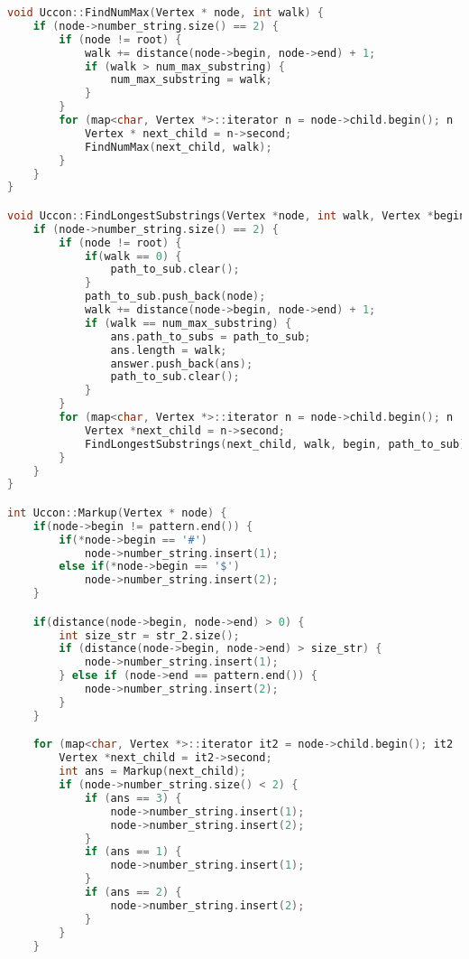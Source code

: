 \begin{lstlisting}[language=C++]
void Uccon::FindNumMax(Vertex * node, int walk) {
    if (node->number_string.size() == 2) {
        if (node != root) {
            walk += distance(node->begin, node->end) + 1;
            if (walk > num_max_substring) {
                num_max_substring = walk;
            }
        }
        for (map<char, Vertex *>::iterator n = node->child.begin(); n != node->child.end(); n++) {
            Vertex * next_child = n->second;
            FindNumMax(next_child, walk);
        }
    }
}

void Uccon::FindLongestSubstrings(Vertex *node, int walk, Vertex *begin, vector <Vertex *> path_to_sub) {
    if (node->number_string.size() == 2) {
        if (node != root) {
            if(walk == 0) {
                path_to_sub.clear();
            }
            path_to_sub.push_back(node);
            walk += distance(node->begin, node->end) + 1;
            if (walk == num_max_substring) {
                ans.path_to_subs = path_to_sub;
                ans.length = walk;
                answer.push_back(ans);
                path_to_sub.clear();
            }
        }
        for (map<char, Vertex *>::iterator n = node->child.begin(); n != node->child.end(); n++) {
            Vertex *next_child = n->second;
            FindLongestSubstrings(next_child, walk, begin, path_to_sub);
        }
    }
}

int Uccon::Markup(Vertex * node) {
    if(node->begin != pattern.end()) {
        if(*node->begin == '#')
            node->number_string.insert(1);
        else if(*node->begin == '$')
            node->number_string.insert(2);
    }

    if(distance(node->begin, node->end) > 0) {
        int size_str = str_2.size();
        if (distance(node->begin, node->end) > size_str) {
            node->number_string.insert(1);
        } else if (node->end == pattern.end()) {
            node->number_string.insert(2);
        }
    }

    for (map<char, Vertex *>::iterator it2 = node->child.begin(); it2 != node->child.end(); it2++) {
        Vertex *next_child = it2->second;
        int ans = Markup(next_child);
        if (node->number_string.size() < 2) {
            if (ans == 3) {
                node->number_string.insert(1);
                node->number_string.insert(2);
            }
            if (ans == 1) {
                node->number_string.insert(1);
            }
            if (ans == 2) {
                node->number_string.insert(2);
            }
        }
    }


\end{lstlisting}
